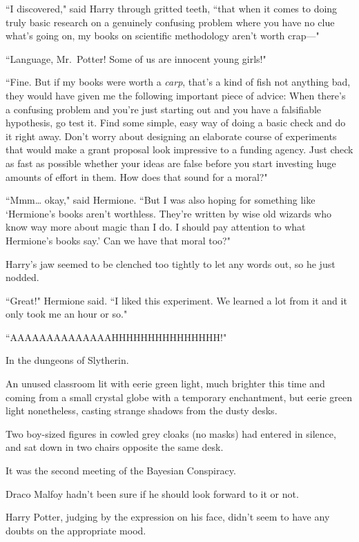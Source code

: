 ``I discovered," said Harry through gritted teeth, ``that when it comes to doing truly basic research on a genuinely confusing problem where you have no clue what's going on, my books on scientific methodology aren't worth crap—"

``Language, Mr.~Potter! Some of us are innocent young girls!"

``Fine. But if my books were worth a \emph{carp}, that's a kind of fish not anything bad, they would have given me the following important piece of advice: When there's a confusing problem and you're just starting out and you have a falsifiable hypothesis, go test it. Find some simple, easy way of doing a basic check and do it right away. Don't worry about designing an elaborate course of experiments that would make a grant proposal look impressive to a funding agency. Just check as fast as possible whether your ideas are false before you start investing huge amounts of effort in them. How does that sound for a moral?"

``Mmm{\ldots} okay," said Hermione. ``But I was also hoping for something like `Hermione's books aren't worthless. They're written by wise old wizards who know way more about magic than I do. I should pay attention to what Hermione's books say.' Can we have that moral too?"

Harry's jaw seemed to be clenched too tightly to let any words out, so he just nodded.

``Great!" Hermione said. ``I liked this experiment. We learned a lot from it and it only took me an hour or so."

``AAAAAAAAAAAAAAHHHHHHHHHHHHHHH!"

\later

In the dungeons of Slytherin.

An unused classroom lit with eerie green light, much brighter this time and coming from a small crystal globe with a temporary enchantment, but eerie green light nonetheless, casting strange shadows from the dusty desks.

Two boy-sized figures in cowled grey cloaks (no masks) had entered in silence, and sat down in two chairs opposite the same desk.

It was the second meeting of the Bayesian Conspiracy.

Draco Malfoy hadn't been sure if he should look forward to it or not.

Harry Potter, judging by the expression on his face, didn't seem to have any doubts on the appropriate mood.

